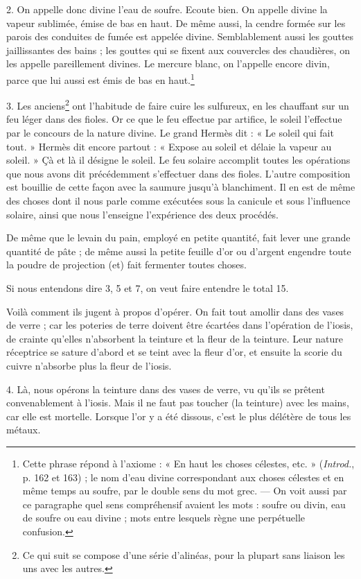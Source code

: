 \documentclass[landscape, a4paper, 11pt, oneside, polutonikogreek, french]{article}
\begin{document}
2. On appelle donc divine l'eau de soufre. Ecoute bien. On appelle divine la vapeur sublimée, émise de bas en haut. De même aussi, la cendre formée sur les parois des conduites de fumée est appelée divine. Semblablement aussi les gouttes jaillissantes des bains ; les gouttes qui se fixent aux couvercles des chaudières, on les appelle pareillement divines. Le mercure blanc, on l'appelle encore divin, parce que lui aussi est émis de bas en haut.\footnote{Cette phrase répond à l'axiome : « En haut les choses célestes, etc. » (\emph{Introd.}, p. 162 et 163) ; le nom d'eau divine correspondant aux choses célestes et en même temps au soufre, par le double sens du mot grec. --- On voit aussi par ce paragraphe quel sens compréhensif avaient les mots : soufre ou divin, eau de soufre ou eau divine ; mots entre lesquels règne une perpétuelle confusion.}

3. Les anciens\footnote{Ce qui suit se compose d'une série d'alinéas, pour la plupart sans liaison les uns avec les autres.} ont l'habitude de faire cuire les sulfureux, en les chauffant sur un feu léger dans des fioles. Or ce que le feu effectue par artifice, le soleil l'effectue par le concours de la nature divine. Le grand Hermès dit : « Le soleil qui fait tout. » Hermès dit encore partout : « Expose au soleil et délaie la vapeur au soleil. » Çà et là il désigne le soleil. Le feu solaire accomplit toutes les opérations que nous avons dit précédemment s'effectuer dans des fioles. L'autre composition est bouillie de cette façon avec la saumure jusqu'à blanchiment. Il en est de même des choses dont il nous parle comme exécutées sous la canicule et sous l'influence solaire, ainsi que nous l'enseigne l'expérience des deux procédés.

De même que le levain du pain, employé en petite quantité, fait lever une grande quantité de pâte ; de même aussi la petite feuille d'or ou d'argent engendre toute la poudre de projection (et) fait fermenter toutes choses.

Si nous entendons dire 3, 5 et 7, on veut faire entendre le total 15.

Voilà comment ils jugent à propos d'opérer. On fait tout amollir dans des vases de verre ; car les poteries de terre doivent être écartées dans l'opération de l'iosis, de crainte qu'elles n'absorbent la teinture et la fleur de la teinture. Leur nature réceptrice se sature d'abord et se teint avec la fleur d'or, et ensuite la scorie du cuivre n'absorbe plus la fleur de l'iosis.

4. Là, nous opérons la teinture dans des vases de verre, vu qu'ils se prêtent convenablement à l'iosis. Mais il ne faut pas toucher (la teinture) avec les mains, car elle est mortelle. Lorsque l'or y a été dissous, c'est le plus délétère de tous les métaux.
\end{document}
